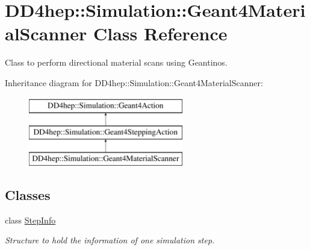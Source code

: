 \hypertarget{class_d_d4hep_1_1_simulation_1_1_geant4_material_scanner}{}\section{D\+D4hep\+:\+:Simulation\+:\+:Geant4\+Material\+Scanner Class Reference}
\label{class_d_d4hep_1_1_simulation_1_1_geant4_material_scanner}


Class to perform directional material scans using Geantinos.  


Inheritance diagram for D\+D4hep\+:\+:Simulation\+:\+:Geant4\+Material\+Scanner\+:\begin{figure}[H]
\begin{center}
\leavevmode
\includegraphics[height=3.000000cm]{class_d_d4hep_1_1_simulation_1_1_geant4_material_scanner}
\end{center}
\end{figure}
\subsection*{Classes}
\begin{DoxyCompactItemize}
\item 
class \hyperlink{class_d_d4hep_1_1_simulation_1_1_geant4_material_scanner_1_1_step_info}{Step\+Info}
\begin{DoxyCompactList}\small\item\em Structure to hold the information of one simulation step. \end{DoxyCompactList}\end{DoxyCompactItemize}
